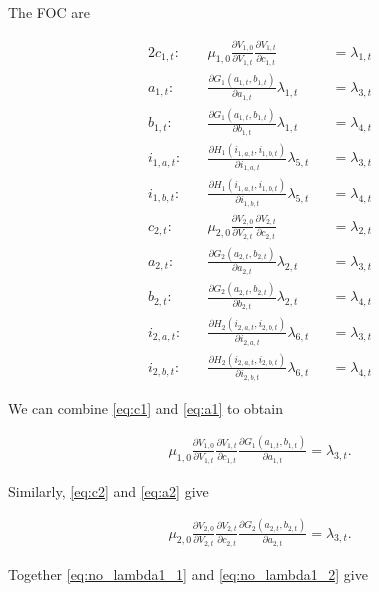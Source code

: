 \documentclass[10pt]{article}
\newcommand{\fracpd}[2]{
  \ensuremath{\frac{\partial #1}{\partial #2}}
}
\begin{document}
The FOC are

\begin{alignat}{2}
  c_{1,t} : \quad   & \mu_{1,0} \fracpd{V_{1,0}}{V_{1,t}} \fracpd{V_{1,t}}{c_{1,t}} & &= \lambda_{1,t} \label{eq:c1} \\
  a_{1,t} : \quad   & \fracpd{G_1(a_{1,t}, b_{1,t})}{a_{1,t}} \lambda_{1,t} & &= \lambda_{3,t} \label{eq:a1} \\
  b_{1,t} : \quad   & \fracpd{G_1(a_{1,t}, b_{1,t})}{b_{1,t}} \lambda_{1,t} & &= \lambda_{4,t} \label{eq:b1} \\
  i_{1,a,t} : \quad & \fracpd{H_1(i_{1,a,t}, i_{1,b,t})}{i_{1,a,t}} \lambda_{5,t} & &= \lambda_{3,t} \label{eq:i1a} \\
  i_{1,b,t} : \quad & \fracpd{H_1(i_{1,a,t}, i_{1,b,t})}{i_{1,b,t}} \lambda_{5,t} & &= \lambda_{4,t} \label{eq:i1b} \\
  c_{2,t} : \quad   & \mu_{2,0} \fracpd{V_{2,0}}{V_{2,t}} \fracpd{V_{2,t}}{c_{2,t}}  & &= \lambda_{2,t} \label{eq:c2} \\
  a_{2,t} : \quad   & \fracpd{G_2(a_{2,t}, b_{2,t})}{a_{2,t}} \lambda_{2,t} & &= \lambda_{3,t} \label{eq:a2} \\
  b_{2,t} : \quad   & \fracpd{G_2(a_{2,t}, b_{2,t})}{b_{2,t}} \lambda_{2,t} & &= \lambda_{4,t} \label{eq:b2} \\
  i_{2,a,t} : \quad & \fracpd{H_2(i_{2,a,t}, i_{2,b,t})}{i_{2,a,t}} \lambda_{6,t} & &= \lambda_{3,t} \label{eq:i2a} \\
  i_{2,b,t} : \quad & \fracpd{H_2(i_{2,a,t}, i_{2,b,t})}{i_{2,b,t}} \lambda_{6,t} & &= \lambda_{4,t} \label{eq:i2b}
\end{alignat}

We can combine \eqref{eq:c1} and \eqref{eq:a1} to obtain

\begin{align} \label{eq:no_lambda1_1}
  \mu_{1,0} \fracpd{V_{1,0}}{V_{1,t}} \fracpd{V_{1,t}}{c_{1,t}} \fracpd{G_1(a_{1,t}, b_{1,t})}{a_{1,t}} = \lambda_{3,t}.
\end{align}

Similarly, \eqref{eq:c2} and \eqref{eq:a2} give

\begin{align} \label{eq:no_lambda1_2}
  \mu_{2,0} \fracpd{V_{2,0}}{V_{2,t}} \fracpd{V_{2,t}}{c_{2,t}} \fracpd{G_2(a_{2,t}, b_{2,t})}{a_{2,t}} = \lambda_{3,t}.
\end{align}

Together \eqref{eq:no_lambda1_1} and \eqref{eq:no_lambda1_2} give
\end{document}
